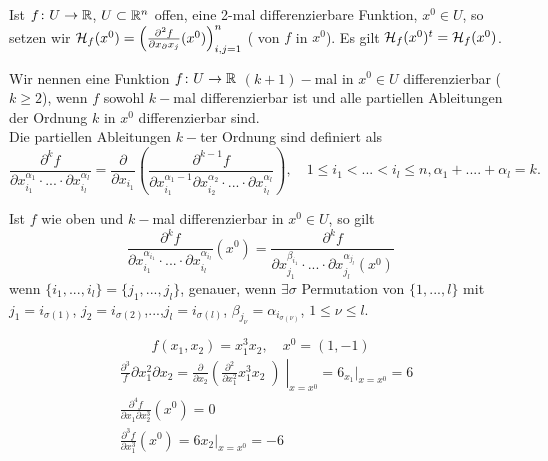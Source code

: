 \begin{definition}
	Ist $ f\colon U\rightarrow\mathbb{R} $, $ U\subset\mathbb{R}^n $ offen, eine 2-mal differenzierbare Funktion, $ x^0\in U $, so setzen wir $ \mathcal H_f(x^0)=\begin{pmatrix}
	\frac{\partial^2 f}{\partial x_\partial x_j}(x^0)
	\end{pmatrix}_{i,j=1}^n $ ( von $ f $ in $ x^0 $). Es gilt $ \mathcal H_f(x^0)^t=\mathcal H_f(x^0) $.
\end{definition}
\begin{definition}
	Wir nennen eine Funktion $ f\colon U\rightarrow\mathbb{R} $ $ (k+1)- $mal in $ x^0\in U $ differenzierbar ($ k\geq 2 $), wenn $ f $ sowohl $ k- $mal differenzierbar ist und alle partiellen Ableitungen der Ordnung $ k $ in $ x^0 $ differenzierbar sind.\\
	Die partiellen Ableitungen $ k- $ter Ordnung sind definiert als
	\[ \frac{\partial^k f}{\partial x_{i_1}^{\alpha_1}\cdot...\cdot\partial x_{i_l}^{\alpha_l}}=\frac{\partial}{\partial x_{i_1}}\left(\frac{\partial^{k-1}f}{\partial x_{i_1}^{\alpha_1-1}\partial x_{i_2}^{\alpha_2}\cdot...\cdot\partial x_{i_l}^{\alpha_l}}\right),\quad 1\leq i_1<...<i_l\leq n,\alpha_1+....+\alpha_l=k. \]
\end{definition}
\begin{lemma}
	Ist $ f $ wie oben und $ k- $mal differenzierbar in $ x^0\in U $, so gilt
	\[ \frac{\partial^k f}{\partial x_{i_1}^{\alpha_{i_1}}\cdot...\cdot\partial x_{i_l}^{\alpha_{i_l}}}(x^0)=\frac{\partial^k f}{\partial x_{j_1}^{\beta_{i_1}}\cdot...\cdot\partial x_{j_l}^{\alpha_{j_l}}(x^0)} \]
	wenn $ \lbrace i_1,...,i_l\rbrace=\lbrace j_1,...,j_l\rbrace $, genauer, wenn $ \exists\sigma $ Permutation von $ \lbrace 1,...,l\rbrace $ mit $ j_1=i_{\sigma(1)} $, $ j_2=i_{\sigma(2)} $,...,$ j_l=i_{\sigma(l)} $, $ \beta_{j_\nu}=\alpha_{i_{\sigma(\nu)}} $, $ 1\leq\nu\leq l $.
\end{lemma}
\begin{beispiel*}
	\[ f(x_1,x_2)=x_1^3x_2,\quad x^0=(1,-1) \]
	\begin{align*} &\frac{\partial^3}{f}\partial x_1^2\partial x_2=\frac{\partial}{\partial x_2}\left(\frac{\partial^2}{\partial x_1^2}x_1^3x_2\middle)\right|_{x=x^0}=6_{x_1}|_{x=x^0}=6\\
	&\frac{\partial^4 f}{\partial x_1\partial x_2^3}(x^0)=0\\
	&\frac{\partial^3 f}{\partial x_1^3} (x^0)=6x_2|_{x=x^0}=-6\end{align*}
\end{beispiel*}
